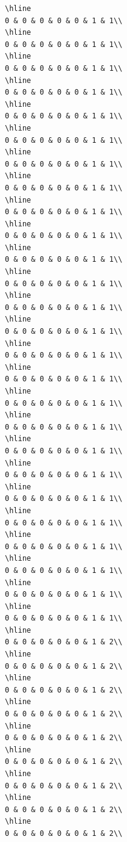 \documentclass[
]{article}
\begin{document}
\begin{verbatim}
\hline
0 & 0 & 0 & 0 & 0 & 1 & 1\\
\hline
0 & 0 & 0 & 0 & 0 & 1 & 1\\
\hline
0 & 0 & 0 & 0 & 0 & 1 & 1\\
\hline
0 & 0 & 0 & 0 & 0 & 1 & 1\\
\hline
0 & 0 & 0 & 0 & 0 & 1 & 1\\
\hline
0 & 0 & 0 & 0 & 0 & 1 & 1\\
\hline
0 & 0 & 0 & 0 & 0 & 1 & 1\\
\hline
0 & 0 & 0 & 0 & 0 & 1 & 1\\
\hline
0 & 0 & 0 & 0 & 0 & 1 & 1\\
\hline
0 & 0 & 0 & 0 & 0 & 1 & 1\\
\hline
0 & 0 & 0 & 0 & 0 & 1 & 1\\
\hline
0 & 0 & 0 & 0 & 0 & 1 & 1\\
\hline
0 & 0 & 0 & 0 & 0 & 1 & 1\\
\hline
0 & 0 & 0 & 0 & 0 & 1 & 1\\
\hline
0 & 0 & 0 & 0 & 0 & 1 & 1\\
\hline
0 & 0 & 0 & 0 & 0 & 1 & 1\\
\hline
0 & 0 & 0 & 0 & 0 & 1 & 1\\
\hline
0 & 0 & 0 & 0 & 0 & 1 & 1\\
\hline
0 & 0 & 0 & 0 & 0 & 1 & 1\\
\hline
0 & 0 & 0 & 0 & 0 & 1 & 1\\
\hline
0 & 0 & 0 & 0 & 0 & 1 & 1\\
\hline
0 & 0 & 0 & 0 & 0 & 1 & 1\\
\hline
0 & 0 & 0 & 0 & 0 & 1 & 1\\
\hline
0 & 0 & 0 & 0 & 0 & 1 & 1\\
\hline
0 & 0 & 0 & 0 & 0 & 1 & 1\\
\hline
0 & 0 & 0 & 0 & 0 & 1 & 1\\
\hline
0 & 0 & 0 & 0 & 0 & 1 & 2\\
\hline
0 & 0 & 0 & 0 & 0 & 1 & 2\\
\hline
0 & 0 & 0 & 0 & 0 & 1 & 2\\
\hline
0 & 0 & 0 & 0 & 0 & 1 & 2\\
\hline
0 & 0 & 0 & 0 & 0 & 1 & 2\\
\hline
0 & 0 & 0 & 0 & 0 & 1 & 2\\
\hline
0 & 0 & 0 & 0 & 0 & 1 & 2\\
\hline
0 & 0 & 0 & 0 & 0 & 1 & 2\\
\hline
0 & 0 & 0 & 0 & 0 & 1 & 2\\

\end{verbatim}
\end{document}
